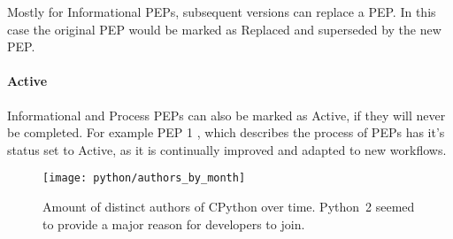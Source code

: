 Mostly for Informational PEPs, subsequent versions can replace a \ac{PEP}. In
this case the original \ac{PEP} would be marked as Replaced and superseded by
the new \ac{PEP}.

\paragraph{Active}

Informational and Process PEPs can also be marked as Active, if they will never
be completed. For example \ac{PEP} 1 \cite{Warsaw2000}, which describes the
process of \acp{PEP} has it's status set to Active, as it is continually
improved and adapted to new workflows.

\begin{figure}[htbp]
  \centering
  \texttt{[image: python/authors\_by\_month]}
  \caption[Authors by month, Python]
  {Amount of distinct authors of CPython over time. Python~2 seemed to provide
    a major reason for developers to join.}
\end{figure}


